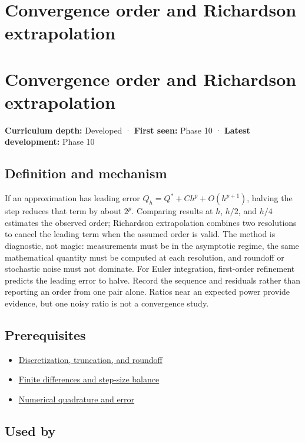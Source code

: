 \hypertarget{appendix-aca80b6bf17a}{}
\section*{Convergence order and Richardson extrapolation}
\section{Convergence order and Richardson extrapolation}\label{convergence-order-and-richardson-extrapolation}

\textbf{Curriculum depth:} Developed · \textbf{First seen:} Phase 10 · \textbf{Latest development:} Phase 10

\subsection{Definition and mechanism}\label{definition-and-mechanism}

If an approximation has leading error \(Q_h=Q^*+Ch^p+O(h^{p+1})\), halving the step reduces that term by about \(2^p\). Comparing results at \(h\), \(h/2\), and \(h/4\) estimates the observed order; Richardson extrapolation combines two resolutions to cancel the leading term when the assumed order is valid. The method is diagnostic, not magic: measurements must be in the asymptotic regime, the same mathematical quantity must be computed at each resolution, and roundoff or stochastic noise must not dominate. For Euler integration, first-order refinement predicts the leading error to halve. Record the sequence and residuals rather than reporting an order from one pair alone. Ratios near an expected power provide evidence, but one noisy ratio is not a convergence study.

\subsection{Prerequisites}\label{prerequisites}

\begin{itemize}
\tightlist
\item
  \hyperref[appendix-6b0648b2b8e8]{Discretization, truncation, and roundoff}
\item
  \hyperref[appendix-e2d7b4f2161d]{Finite differences and step-size balance}
\item
  \hyperref[appendix-80521eae6b71]{Numerical quadrature and error}
\end{itemize}

\subsection{Used by}\label{used-by}

